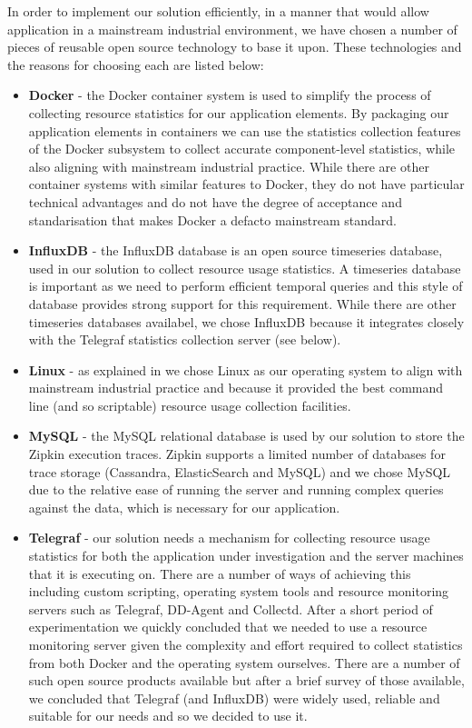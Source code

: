 In order to implement our solution efficiently, in a manner that would allow application in a mainstream industrial environment, we have chosen a number of pieces of reusable open source technology to base it upon.  These technologies and the reasons for choosing each are listed below:

\begin{itemize}
	\item \textbf{Docker} - the Docker container system is used to simplify the process of collecting resource statistics for our application elements. By packaging our application elements in containers we can use the statistics collection features of the Docker subsystem to collect accurate component-level statistics, while also aligning with mainstream industrial practice.  While there are other container systems with similar features to Docker, they do not have particular technical advantages and do not have the degree of acceptance and standarisation that makes Docker a defacto mainstream standard.
	\item \textbf{InfluxDB} - the InfluxDB database is an open source timeseries database, used in our solution to collect resource usage statistics.  A timeseries database is important as we need to perform efficient temporal queries and this style of database provides strong support for this requirement.  While there are other timeseries databases availabel, we chose InfluxDB because it integrates closely with the Telegraf statistics collection server (see below).
	\item \textbf{Linux} - as explained in  we chose Linux as our operating system to align with mainstream industrial practice and because it provided the best command line (and so scriptable) resource usage collection facilities.
	\item \textbf{MySQL} - the MySQL relational database is used by our solution to store the Zipkin execution traces.  Zipkin supports a limited number of databases for trace storage (Cassandra, ElasticSearch and MySQL) and we chose MySQL due to the relative ease of running the server and running complex queries against the data, which is necessary for our application.
	\item \textbf{Telegraf} - our solution needs a mechanism for collecting resource usage statistics for both the application under investigation and the server machines that it is executing on.  There are a number of ways of achieving this including custom scripting, operating system tools and resource monitoring servers such as Telegraf, DD-Agent and Collectd.  After a short period of experimentation we quickly concluded that we needed to use a resource monitoring server given the complexity and effort required to collect statistics from both Docker and the operating system ourselves.  There are a number of such open source products available but after a brief survey of those available, we concluded that Telegraf (and InfluxDB) were widely used, reliable and suitable for our needs and so we decided to use it.

\end{itemize}
